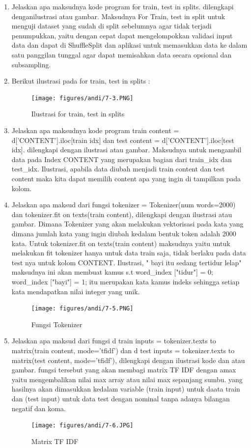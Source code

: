 \begin{enumerate}
\item Jelaskan apa maksudnya kode program for train, test in splits. dilengkapi denganilustrasi atau gambar.
\subitem Maksudnya For Train, test in split untuk menguji dataset yang sudah di split sebelumnya agar tidak terjadi penumpukkan, yaitu dengan cepat dapat mengelompokkan validasi input data dan dapat di ShuffleSplit dan aplikasi untuk memasukkan data ke dalam satu panggilan tunggal agar dapat memisahkan data secara opsional dan subsampling.

\item Berikut ilustrasi pada for train, test in splits :
\begin{figure}[ht]
\centering
\texttt{[image: figures/andi/7-3.PNG]}
\caption{Ilustrasi for train, test in splits}
\label{Teori}
\end{figure}

\item Jelaskan apa maksudnya kode program train content = d[’CONTENT’].iloc[train idx] dan test content = d[’CONTENT’].iloc[test idx]. dilengkapi dengan ilustrasi atau gambar.
\subitem Maksudnya untuk mengambil data pada Index CONTENT yang merupakan bagian dari train\_idx dan test\_idx. 
Ilustrasi, apabila data diubah menjadi train content dan test content maka kita dapat memilih content apa yang ingin di tampilkan pada kolom.

\item Jelaskan apa maksud dari fungsi tokenizer = Tokenizer(num words=2000) dan tokenizer.fit on texts(train content), dilengkapi dengan ilustrasi atau gambar.
\subitem Dimana Tokenizer yang akan melakukan vektorisasi pada kata yang dimana jumlah kata yang ingin diubah kedalam bentuk token adalah 2000 kata. Untuk tokenizer.fit on texts(train content) maksudnya yaitu untuk melakukan fit tokenizer hanya untuk data train saja, tidak berlaku pada data test nya untuk kolom CONTENT. Ilustrasi, " bayi itu sedang tertidur lelap" maksudnya ini akan membuat kamus s.t word\_index ["tidur"] = 0; word\_index ["bayi"] = 1; itu merupakan kata  kamus indeks sehingga setiap kata mendapatkan nilai integer yang unik.
\begin{figure}[!htbp]
	\centerline{\texttt{[image: figures/andi/7-5.PNG]}}
	\caption{Fungsi Tokenizer}
	\label{Teori}
\end{figure}

\item Jelaskan apa maksud dari fungsi d train inputs = tokenizer.texts to matrix(train content, mode=’tfidf’) dan d test inputs = tokenizer.texts to matrix(test content, mode=’tfidf’), dilengkapi dengan ilustrasi kode dan atau gambar.
\subitem fungsi tersebut yang akan membagi matrix TF IDF dengan amax yaitu mengembalikan nilai max array atau nilai max sepanjang sumbu. yang hasilnya akan dimasukkan kedalam variable (train input) untuk daata train dan (test input) untuk data test dengan nominal tanpa adanya bilangan negatif dan koma.
\begin{figure}[!htbp]
	\centerline{\texttt{[image: figures/andi/7-6.JPG]}}
	\caption{Matrix TF IDF}
	\label{Teori}
\end{figure}


\end{enumerate}
